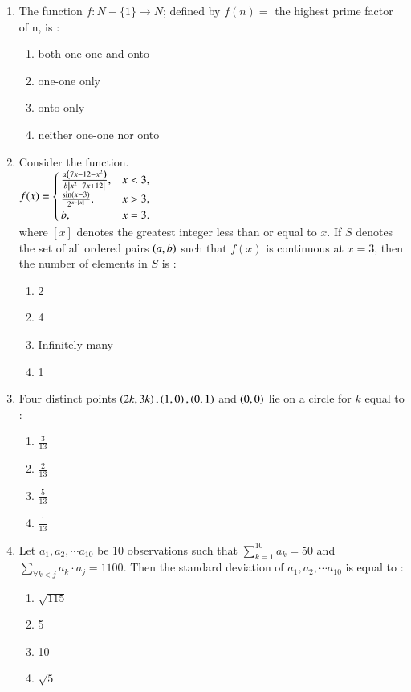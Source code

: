 \documentclass[journal]{IEEEtran}
\begin{document}
\begin{enumerate}[start=16]
\item The function $f  : N-{\{1}\}\rightarrow N$; defined by $f(n)=$ the highest prime factor of n, is :
\begin{enumerate}
    \item both one-one and onto
    \item one-one only
    \item onto only
    \item neither one-one nor onto
\end{enumerate}

\item Consider the function.\\
$f(x)= \begin{cases} 
\frac{a \left(7x - 12 - x^2\right)}{b\left\vert x^2 - 7x + 12\right\vert}, & x < 3, \\
\frac{\sin(x - 3)}{2^{x - {[x]}}}, & x > 3, \\
b, & x = 3.
\end{cases}
$\\
where ${[x]}$ denotes the greatest integer less than or equal to $x$. If $S$ denotes the set of all ordered pairs $\left(a,b\right)$ such that $f(x)$ is continuous at $x=3$, then the number of elements in $S$ is : 
\begin{enumerate}
    \item 2
    \item 4
    \item Infinitely many
    \item 1
\end{enumerate}

\item Four distinct points $\left(2k,3k\right), \left(1,0\right), \left(0,1\right)$ and $\left(0,0\right)$ lie on a circle for $k$ equal to :
\begin{enumerate}
    \item $\frac{3}{13}$\\
    \item $\frac{2}{13}$\\
    \item $\frac{5}{13}$\\
    \item $\frac{1}{13}$
\end{enumerate}

\item Let $a_1, a_2, \cdots a_{10}$ be 10 observations such that  $\sum_{k=1}^{10} a_k=50$ and $\sum_{\forall k < j} a_k \cdot a_j = 1100$. Then the standard deviation of $a_1,a_2,\cdots a_{10}$ is equal to :
\begin{enumerate}
    \item $\sqrt{115}$
    \item 5
    \item 10
    \item $\sqrt{5}$
\end{enumerate}


\end{enumerate}
\end{document}

